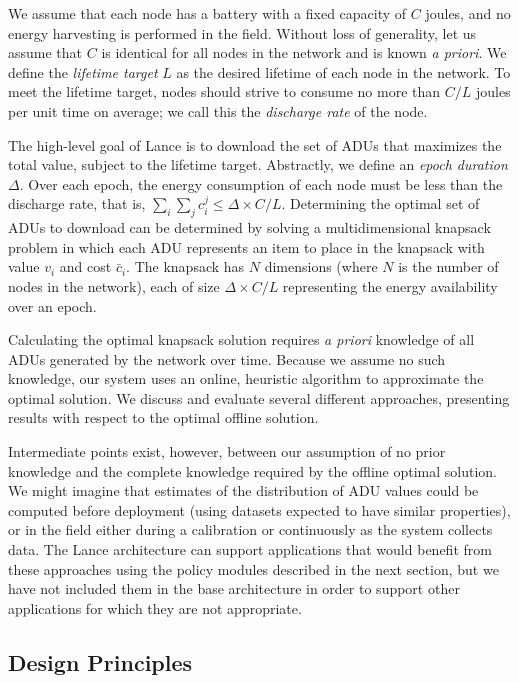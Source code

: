 We assume that each node has a battery with a fixed capacity of $C$ joules,
and no energy harvesting is performed in the field. Without loss of
generality, let us assume that $C$ is identical for all nodes in the network
and is known \textit{a priori}. We define the \textit{lifetime target} $L$
as the desired lifetime of each node in the network. To meet the lifetime
target, nodes should strive to consume no more than $C/L$ joules per unit
time on average; we call this the \textit{discharge rate} of the node. 

The high-level goal of Lance is to download the set of ADUs that maximizes
the total value, subject to the lifetime target. Abstractly, we define an
\textit{epoch duration} $\Delta$. Over each epoch, the energy consumption of
each node must be less than the discharge rate, that is, $\sum_i \sum_j c_i^j
\leq \Delta \times C/L$. Determining the optimal set of ADUs to download can
be determined by solving a multidimensional knapsack problem in which each
ADU represents an item to place in the knapsack with value $v_i$ and cost
$\bar{c}_i$. The knapsack has $N$ dimensions (where $N$ is the number of
nodes in the network), each of size $\Delta \times C/L$ representing the
energy availability over an epoch. 

Calculating the optimal knapsack solution requires \textit{a priori}
knowledge of all ADUs generated by the network over time. Because we assume
no such knowledge, our system uses an online, heuristic algorithm to
approximate the optimal solution. We discuss and evaluate several different
approaches, presenting results with respect to the optimal offline solution.

Intermediate points exist, however, between our assumption of no prior
knowledge and the complete knowledge required by the offline optimal
solution. We might imagine that estimates of the distribution of ADU values
could be computed before deployment (using datasets expected to have similar
properties), or in the field either during a calibration or continuously as
the system collects data. The Lance architecture can support applications
that would benefit from these approaches using the policy modules described
in the next section, but we have not included them in the base architecture
in order to support other applications for which they are not appropriate.

\subsection{Design Principles}

